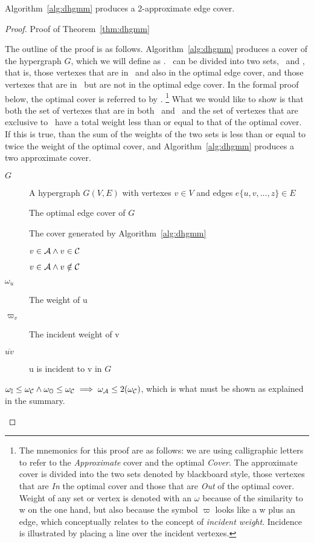 

\begin{thm}
  Algorithm~\ref{alg:dhgmm} produces a 2-approximate edge cover.
  \label{thm:dhgmm}
\end{thm}
\begin{proof}{Proof of Theorem~\ref{thm:dhgmm}}
  \begin{smy}
    The outline of the proof is as follows. Algorithm~\ref{alg:dhgmm} produces a cover of the hypergraph $G$, which we will define as \cBd. \cBd\ can be divided into two sets, \bId\ and \bOd, that is, those vertexes that are in \cAd\ and also in the optimal edge cover, and those vertexes that are in \cAd\ but are not in the optimal edge cover. In the formal proof below, the optimal cover is referred to by \cCd. \footnote{The mnemonics for this proof are as follows: we are using calligraphic letters to refer to the {\em Approximate} cover and the optimal {\em Cover}. The approximate cover is divided into the two sets denoted by blackboard style, those vertexes that are {\em In} the optimal cover and those that are {\em Out} of the optimal cover. Weight of any set or vertex is denoted with an $\omega$ because of the similarity to w on the one hand, but also because the symbol $\varpi$ looks like a w plus an edge, which conceptually relates to the concept of {\em incident weight}. Incidence is illustrated by placing a line over the incident vertexes.} What we would like to show is that both the set of vertexes that are in both \cAd\ and \cCd\ and the set of vertexes that are exclusive to \cAd\ have a total weight less than or equal to that of the optimal cover. If this is true, than the sum of the weights of the two sets is less than or equal to twice the weight of the optimal cover, and Algorithm~\ref{alg:dhgmm} produces a two approximate cover.
  \end{smy}
    
  \begin{dfn}
    \begin{description}
    \item[$G$] A hypergraph $G(V,E)$ with vertexes $v \in V$ and edges $e\{u,v,...,z\} \in E$
    \item[\cCd] The optimal edge cover of $G$
    \item[\cAd] The cover generated by Algorithm~\ref{alg:dhgmm}
    \item[\bId] $v \in {\mathcal A} \land v\in {\mathcal C}$
    \item[\bOd] $v \in {\mathcal A} \land v\notin {\mathcal C}$
    \item[$\omega_u$] The weight of u
    \item[$\varpi_v$] The incident weight of v
    \item[$ \overline{uv} $] u is incident to v in $G$
    \end{description}
  \end{dfn}
  \begin{prop}
    $\omega_{{\mathbb I}} \le \omega_{{\mathcal C}} \land \omega_{{\mathbb O}} \le \omega_{{\mathcal C}} \implies \omega_{{\mathcal A}} \le 2(\omega_{{\mathcal C}})$, which is what must be shown as explained in the summary.
    \label{prp:weightcomp}
  \end{prop}


\end{proof}

